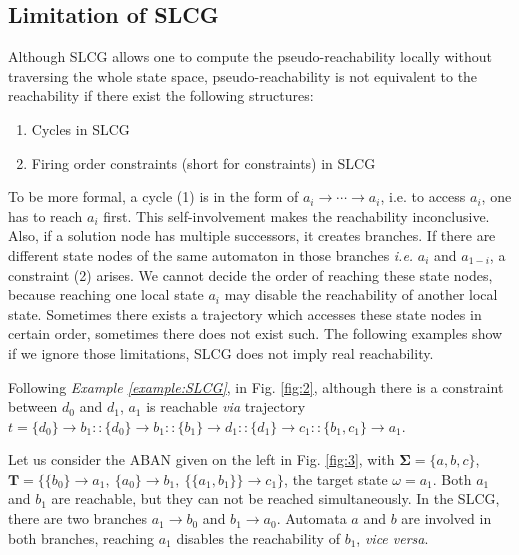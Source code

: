 \documentclass[runningheads]{llncs}
\newcommand{\acm}[3]{\{#1\}\rightarrow#3}
\begin{document}
\subsection{Limitation of SLCG}\label{limitation}
Although SLCG allows one to compute the pseudo-reachability locally without traversing the whole state space, pseudo-reachability is not equivalent to the reachability if there exist the following structures:
\begin{enumerate}[label={(\arabic*)}]
\item Cycles in SLCG
\item Firing order constraints (short for constraints) in SLCG
\end{enumerate}
To be more formal, a cycle (1) is in the form of $a_i\to\cdots\to a_i$, i.e. to access $a_i$, one has to reach $a_i$ first. This self-involvement makes the reachability inconclusive. 
Also, if a solution node has multiple successors, it creates branches.
If there are different state nodes of the same automaton in those branches \textit{i.e.} $a_i$ and $a_{1-i}$, a constraint (2) arises. 
We cannot decide the order of reaching these state nodes, because reaching one local state $a_i$ may disable the reachability of another local state.
Sometimes there exists a trajectory which accesses these state nodes in certain order, sometimes there does not exist such.
The following examples show if we ignore those limitations, SLCG does not imply real reachability.


\begin{example}\label{example:reach}
Following \textit{Example \ref{example:SLCG}}, in Fig. \ref{fig:2}, although there is a constraint between $d_0$ and $d_1$, $a_1$ is reachable \textit{via} trajectory $t=\acm{d_0}{b_0}{b_1}::\acm{d_0}{b_0}{b_1}::\acm{b_1}{d_0}{d_1}::\acm{d_1}{c_0}{c_1}::\acm{b_1,c_1}{a_0}{a_1}$.
\end{example}

\begin{example}\label{example:unreach}
Let us consider the ABAN given on the left in Fig. \ref{fig:3}, with $\mathbf{\Sigma}=\{a,b,c\}$, $\mathbf{T}=\{\acm{b_0}{a_0}{a_1},\ \acm{a_0}{b_0}{b_1},\ \acm{\{a_1,b_1\}}{c_0}{c_1}\}$, the target state $\omega=a_1$. 
Both $a_1$ and $b_1$ are reachable, but they can not be reached simultaneously.
In the SLCG, there are two branches $a_1\to b_0$ and $b_1\to a_0$.
Automata $a$ and $b$ are involved in both branches, reaching $a_1$ disables the reachability of $b_1$, \textit{vice versa}.
\end{example}
\end{document}
